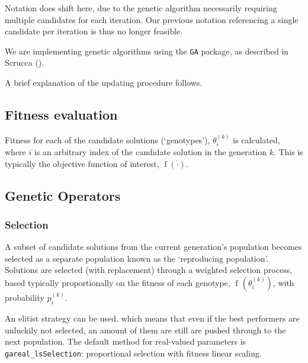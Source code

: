 \documentclass[
  a4paper,
  DIV=11,
  numbers=noendperiod]{scrartcl}
\newcommand{\+}{\phantom{-}}
\newcommand{\op}[2]{\operatorname{#1}\left(#2\right)}
\begin{document}
Notation does shift here, due to the genetic algorithm necessarily
requiring multiple candidates for each iteration. Our previous notation
referencing a single candidate per iteration is thus no longer feasible.

We are implementing genetic algorithms using the \texttt{GA} package, as
described in Scrucca ().

A brief explanation of the updating procedure follows.

\subsection{\texorpdfstring{\textbf{Fitness
evaluation}}{Fitness evaluation}}\label{fitness-evaluation}

Fitness for each of the candidate solutions (`genotypes'),
\(\theta_i^{\left(k\right)}\) is calculated, where \(i\) is an arbitrary
index of the candidate solution in the generation \(k\). This is
typically the objective function of interest, \(\op f{\cdot}\).

\subsection{Genetic Operators}\label{genetic-operators}

\subsubsection{\texorpdfstring{\textbf{Selection}}{Selection}}\label{selection}

A subset of candidate solutions from the current generation's population
becomes selected as a separate population known as the `reproducing
population'. Solutions are selected (with replacement) through a
weighted selection process, based typically proportionally on the
fitness of each genotype, \(\op{f\!}{\theta_i^{\left(k\right)}}\), with
probability \(p_i^{\left(k\right)}\).

An elitist strategy can be used, which means that even if the best
performers are unluckily not selected, an amount of them are still are
pushed through to the next population. The default method for
real-valued parameters is \texttt{gareal\_lsSelection}: proportional
selection with fitness linear scaling.
\end{document}
